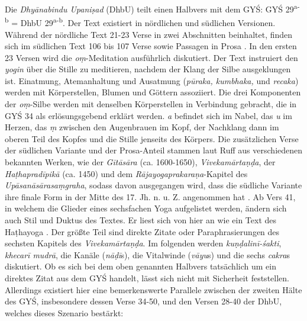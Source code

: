 \documentclass[a4paper,12pt]{article}
\begin{document}
Die \textit{Dhyānabindu Upaniṣad} (DhbU) teilt einen Halbvers mit dem GYŚ: GYŚ 29\textsuperscript{a-b} = DhbU 29\textsuperscript{a-b}. Der Text existiert in nördlichen und südlichen Versionen. Während der nördliche Text 21-23 Verse in zwei Abschnitten beinhaltet, finden sich im südlichen Text 106 bis 107 Verse sowie Passagen in Prosa \parencite[110]{clark2011}. In den ersten 23 Versen wird die \textit{oṃ}-Meditation ausführlich diskutiert. Der Text instruiert den \textit{yogin} über die Stille zu meditieren, nachdem der Klang der Silbe ausgeklungen ist. Einatmung, Atemanhaltung und Ausatmung (\textit{pūraka, kumbhaka,} und \textit{recaka}) werden mit Körperstellen, Blumen und Göttern assoziiert. Die drei Komponenten der \textit{oṃ}-Silbe werden mit denselben Körperstellen in Verbindung gebracht, die in GYŚ 34 als erlösungsgebend erklärt werden. \textit{a} befindet sich im Nabel, das \textit{u} im Herzen, das \textit{ṃ} zwischen den Augenbrauen im Kopf, der Nachklang dann im oberen Teil des Kopfes und die Stille jenseits des Körpers. Die zusätzlichen Verse der südlichen Variante und der Prosa-Anteil stammen laut Ruff aus verschiedenen bekannten Werken, wie der \textit{Gītāsāra} (ca. 1600-1650), \textit{Vivekamārtaṇḍa}, der \textit{Haṭhapradīpikā} (ca. 1450) und dem \textit{Rājayogaprakaraṇa}-Kapitel des \textit{Upāsanāsārasaṃgraha}, sodass davon ausgegangen wird, dass die südliche Variante ihre finale Form in der Mitte des 17. Jh. n. u. Z. angenommen hat \parencite[111]{clark2011}. Ab Vers 41, in welchem die Glieder eines sechsfachen Yoga aufgelistet werden, ändern sich auch Stil und Duktus des Textes. Er liest sich von hier an wie ein Text des Haṭhayoga \parencite[494]{feuerstein2008}. Der größte Teil sind direkte Zitate oder Paraphrasierungen des sechsten Kapitels des \textit{Vivekamārtaṇḍa}. Im folgenden werden \textit{kuṇḍalinī-śakti}, \textit{khecarī mudrā}, die Kanäle (\textit{nāḍī}s), die Vitalwinde (\textit{vāyu}s) und die sechs \textit{cakra}s diskutiert. Ob es sich bei dem oben genannten Halbvers tatsächlich um ein direktes Zitat aus dem GYŚ handelt, lässt sich nicht mit Sicherheit feststellen. Allerdings existiert hier eine bemerkenswerte Parallele zwischen der zweiten Hälte des GYŚ, insbesondere dessen Verse 34-50, und den Versen 28-40 der DhbU, welches dieses Szenario bestärkt:
\end{document}
